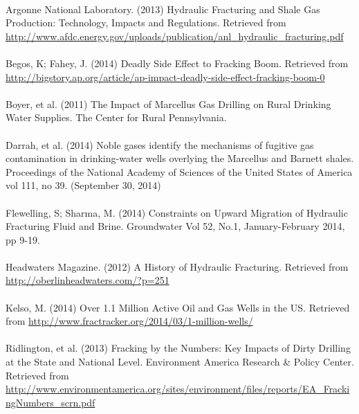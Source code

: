 \documentclass{article}
\begin{document}
  \paragraph{}  Argonne National Laboratory. (2013) Hydraulic Fracturing and Shale Gas Production: Technology, Impacts and Regulations. Retrieved from \url{http://www.afdc.energy.gov/uploads/publication/anl_hydraulic_fracturing.pdf}
  \paragraph{}  Begos, K; Fahey, J. (2014) Deadly Side Effect to Fracking Boom. Retrieved from \url{http://bigstory.ap.org/article/ap-impact-deadly-side-effect-fracking-boom-0}
  \paragraph{} Boyer, et al. (2011) The Impact of Marcellus Gas Drilling on Rural Drinking Water Supplies. The Center for Rural Pennsylvania.
  \paragraph{} Darrah, et al. (2014) Noble gases identify the mechanisms of fugitive gas contamination in drinking-water wells overlying the Marcellus and Barnett shales. Proceedings of the National Academy of Sciences of the United States of America vol 111, no 39. (September 30, 2014)
  \paragraph{} Flewelling, S; Sharma, M. (2014) Constraints on Upward Migration of Hydraulic Fracturing Fluid and Brine. Groundwater Vol 52, No.1, January-February 2014, pp 9-19.
  \paragraph{}  Headwaters Magazine. (2012) A History of Hydraulic Fracturing. Retrieved from \url{http://oberlinheadwaters.com/?p=251}
  \paragraph{}  Kelso, M. (2014) Over 1.1 Million Active Oil and Gas Wells in the US. Retrieved from \url{http://www.fractracker.org/2014/03/1-million-wells/}
  \paragraph{}  Ridlington, et al. (2013) Fracking by the Numbers: Key Impacts of Dirty Drilling at the State and National Level. Environment America Research \& Policy Center. Retrieved from \url{http://www.environmentamerica.org/sites/environment/files/reports/EA_FrackingNumbers_scrn.pdf}
\end{document}
